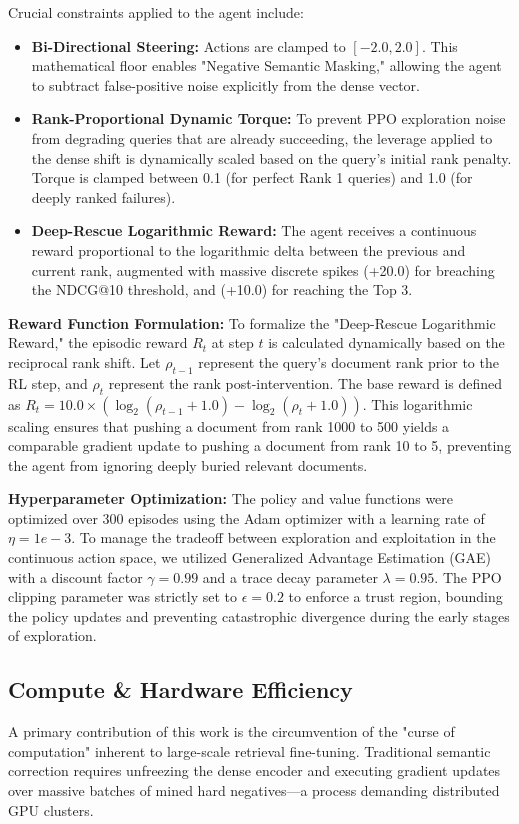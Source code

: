 Crucial constraints applied to the agent include:
\begin{itemize}
    \item \textbf{Bi-Directional Steering:} Actions are clamped to $[-2.0, 2.0]$. This mathematical floor enables "Negative Semantic Masking," allowing the agent to subtract false-positive noise explicitly from the dense vector.
    \item \textbf{Rank-Proportional Dynamic Torque:} To prevent PPO exploration noise from degrading queries that are already succeeding, the leverage applied to the dense shift is dynamically scaled based on the query's initial rank penalty. Torque is clamped between 0.1 (for perfect Rank 1 queries) and 1.0 (for deeply ranked failures).
    \item \textbf{Deep-Rescue Logarithmic Reward:} The agent receives a continuous reward proportional to the logarithmic delta between the previous and current rank, augmented with massive discrete spikes (+20.0) for breaching the NDCG@10 threshold, and (+10.0) for reaching the Top 3.
\end{itemize}

\textbf{Reward Function Formulation:}
To formalize the "Deep-Rescue Logarithmic Reward," the episodic reward $R_t$ at step $t$ is calculated dynamically based on the reciprocal rank shift. Let $\rho_{t-1}$ represent the query's document rank prior to the RL step, and $\rho_t$ represent the rank post-intervention. The base reward is defined as $R_t = 10.0 \times (\log_2(\rho_{t-1} + 1.0) - \log_2(\rho_t + 1.0))$. This logarithmic scaling ensures that pushing a document from rank 1000 to 500 yields a comparable gradient update to pushing a document from rank 10 to 5, preventing the agent from ignoring deeply buried relevant documents.

\textbf{Hyperparameter Optimization:}
The policy and value functions were optimized over 300 episodes using the Adam optimizer with a learning rate of $\eta = 1e-3$. To manage the tradeoff between exploration and exploitation in the continuous action space, we utilized Generalized Advantage Estimation (GAE) with a discount factor $\gamma = 0.99$ and a trace decay parameter $\lambda = 0.95$. The PPO clipping parameter was strictly set to $\epsilon = 0.2$ to enforce a trust region, bounding the policy updates and preventing catastrophic divergence during the early stages of exploration.

\subsection{Compute \& Hardware Efficiency}
A primary contribution of this work is the circumvention of the "curse of computation" inherent to large-scale retrieval fine-tuning. Traditional semantic correction requires unfreezing the dense encoder and executing gradient updates over massive batches of mined hard negatives—a process demanding distributed GPU clusters.

